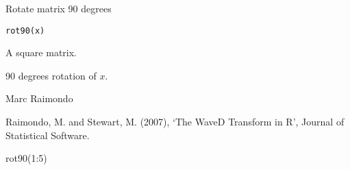\documentclass{article}
\begin{document}
\begin{Description}\relax
Rotate matrix 90 degrees
\end{Description}
\begin{Usage}
\begin{verbatim}
rot90(x)
\end{verbatim}
\end{Usage}
\begin{Arguments}
\begin{ldescription}
\item[\code{x}] A square matrix. 
\end{ldescription}
\end{Arguments}
\begin{Value}
90 degrees rotation of $x$.
\end{Value}
\begin{Author}\relax
Marc Raimondo
\end{Author}
\begin{References}\relax
Raimondo, M. and Stewart, M. (2007),
`The WaveD Transform in R', Journal of Statistical Software.
\end{References}
\begin{SeeAlso}\relax
{}
\end{SeeAlso}
\begin{Examples}
\begin{ExampleCode} rot90(1:5)\end{ExampleCode}
\end{Examples}
\end{document}
